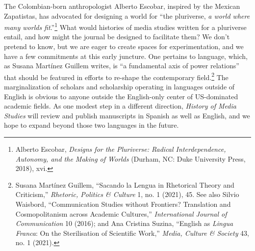 \documentclass{tufte-handout}
\begin{document}
The Colombian-born anthropologist Alberto Escobar, inspired by the
Mexican Zapatistas, has advocated for designing a world for ``the
pluriverse, \emph{a world where many worlds
fit}.''\footnote{Alberto Escobar, \emph{Designs for the Pluriverse: Radical
  Interdependence, Autonomy, and the Making of Worlds} (Durham, NC: Duke
  University Press, 2018), xvi.
} What would histories of
media studies written for a pluriverse entail, and how might the journal
be designed to facilitate them? We don't pretend to know, but we are
eager to create spaces for experimentation, and we have a few
commitments at this early juncture. One pertains to language, which, as
Susana Martínez Guillem writes, is ``a fundamental axis of power
relations'' that should be featured in efforts to re-shape the
contemporary field.\footnote{Susana Martínez Guillem, ``Sacando la Lengua in Rhetorical Theory and
  Criticism,'' \emph{Rhetoric, Politics \& Culture} 1, no. 1 (2021), 45.
  See also Silvio Waisbord, ``Communication Studies without Frontiers?
  Translation and Cosmopolitanism across Academic Cultures,''
  \emph{International Journal of Communication} 10 (2016); and Ana
  Cristina Suzina, ``English as \emph{Lingua Franca}: On the
  Sterilisation of Scientific Work,'' \emph{Media, Culture \& Society}
  43, no. 1 (2021).
} The
marginalization of scholars and scholarship operating in languages
outside of English is obvious to anyone outside the English-only center
of US-dominated academic fields. As one modest step in a different
direction, \emph{History of Media Studies} will review and publish
manuscripts in Spanish as well as English, and we hope to expand beyond
those two languages in the future.
\end{document}
